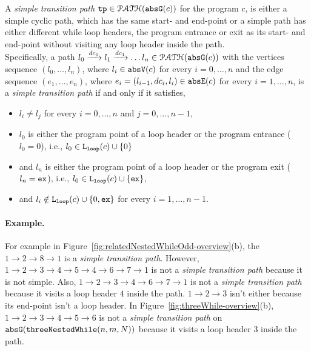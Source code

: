 \begin{defn}
  \label{def:tpath}
A \emph{simple transition path}
$\mathtt{tp} \in \mathcal{PATH}(\mathtt{abs}{\mathtt{G}}(c))$ for the program $c$, is either a simple cyclic path, which has the same start- and end-point
or a simple path has either different while loop headers, the program entrance or exit as its start- and end-point
without visiting any loop header inside the path.
\\
Specifically, a path $l_0 \xrightarrow{dc_0} l_1 \xrightarrow{dc_1} \ldots l_n \in \mathcal{PATH}(\mathtt{abs}{\mathtt{G}}(c))$ with the
vertices sequence $(l_0, \ldots, l_n)$, where $l_i \in \mathtt{abs}{\mathtt{V}}(c)$ for every $i = 0, \ldots, n$ and
%
the edge sequence $(e_1, \ldots, e_n)$, where $e_i = (l_{i - 1}, dc_i, l_{i}) \in \mathtt{abs}{\mathtt{E}}(c)$ for every $i = 1, \ldots, n$,
%
is a \emph{simple transition path} if and only if it satisfies,
\begin{itemize}
  \item $l_i \neq l_j$ for every $i = 0, \ldots, n$ and $j = 0, \ldots, {n - 1}$,
  \item $l_0$ is either the program point of a loop header or the program entrance ($l_0 = 0$),
  i.e., $l_0 \in \mathtt{L}_{\mathtt{loop}}(c) \cup \{ 0 \}$
  \item and $l_n$ is either the program point of a loop header or the program exit ($l_n = \mathtt{ex}$),
  i.e., $l_0 \in \mathtt{L}_{\mathtt{loop}}(c) \cup \{ \mathtt{ex} \}$,
  \item and $l_i \notin \mathtt{L}_{\mathtt{loop}}(c) \cup \{ 0, \mathtt{ex} \}$ for every $i = 1, \ldots, n-1$.
\end{itemize}
\end{defn}


\paragraph{Example.}
For example in Figure~\ref{fig:relatedNestedWhileOdd-overview}(b), the $1 \to 2 \to 8 \to 1$ is a \emph{simple transition path}.
However, $1 \to 2 \to 3 \to 4 \to 5 \to 4 \to 6 \to 7 \to 1$ is not a \emph{simple transition path} because it is not simple.
Also, $1 \to 2 \to 3 \to 4 \to 6 \to 7 \to 1$ is not a \emph{simple transition path} because it visits a loop header $4$ inside the path. $1 \to 2 \to 3$ isn't either because its end-point isn't a loop header.
In Figure~\ref{fig:threeWhile-overview}(b), $1 \to 2 \to 3 \to 4 \to 5 \to 6$ is not a \emph{simple transition path} on $\mathtt{abs}{\mathtt{G}}(\mathtt{threeNestedWhile}(n, m, N))$ because it visits a loop header $3$ inside the path.


